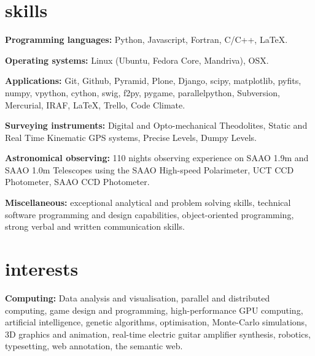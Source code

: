 \documentclass[]{friggeri-cv} %
\begin{document}
\pagebreak
\section{skills}

\textbf{Programming languages:} Python, Javascript, Fortran, C/C++, \LaTeX.

\textbf{Operating systems:} Linux (Ubuntu, Fedora Core, Mandriva), OSX.

\textbf{Applications:} Git, Github, Pyramid, Plone, Django, scipy, matplotlib, pyfits, numpy, vpython, cython, swig, f2py, pygame, parallelpython, Subversion, Mercurial, IRAF, \LaTeX, Trello, Code Climate.

\textbf{Surveying instruments:} Digital and Opto-mechanical Theodolites, Static and Real Time Kinematic GPS
    systems, Precise Levels, Dumpy Levels.

\textbf{Astronomical observing:} 110 nights observing experience on SAAO 1.9m and SAAO 1.0m Telescopes using
     the SAAO High-speed Polarimeter, UCT CCD Photometer, SAAO CCD Photometer.

\textbf{Miscellaneous:} exceptional analytical and problem solving skills, technical software programming and design capabilities, object-oriented programming, strong verbal and written communication skills.




\section{interests}

\textbf{Computing:} Data analysis and visualisation, parallel and distributed computing, game design and programming, high-performance GPU computing, artificial intelligence, genetic algorithms, optimisation, Monte-Carlo simulations, 3D graphics and animation, real-time electric guitar amplifier synthesis, robotics, typesetting, web annotation, the semantic web.
\end{document}
